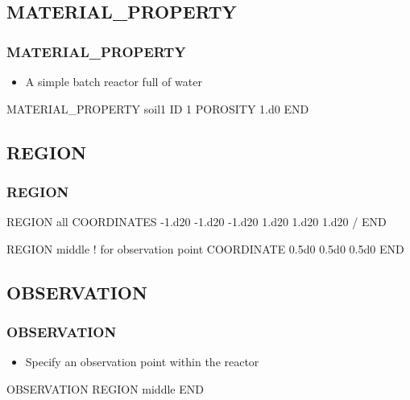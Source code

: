 \documentclass{beamer}
\newcommand\bluecomment[1]{{{\color{blue} #1}}}
\begin{document}
\subsection{MATERIAL\_PROPERTY}

\begin{frame}[fragile]\frametitle{MATERIAL\_PROPERTY}

\begin{itemize}
  \item A simple batch reactor full of water
\end{itemize}

\begin{semiverbatim}


MATERIAL_PROPERTY soil1
  ID 1
  POROSITY 1.d0
END
\end{semiverbatim}

\end{frame}

\subsection{REGION}

\begin{frame}[fragile]\frametitle{REGION}

\begin{semiverbatim}

REGION all
  COORDINATES
    -1.d20 -1.d20 -1.d20
    1.d20 1.d20 1.d20
  /
END

REGION middle   \bluecomment{! for observation point}
  COORDINATE 0.5d0 0.5d0 0.5d0
END

\end{semiverbatim}

\end{frame}

\subsection{OBSERVATION}

\begin{frame}[fragile]\frametitle{OBSERVATION}

\begin{itemize}
  \item Specify an observation point within the reactor
\end{itemize}

\begin{semiverbatim}


OBSERVATION
  REGION middle
END

\end{semiverbatim}

\end{frame}
\end{document}
